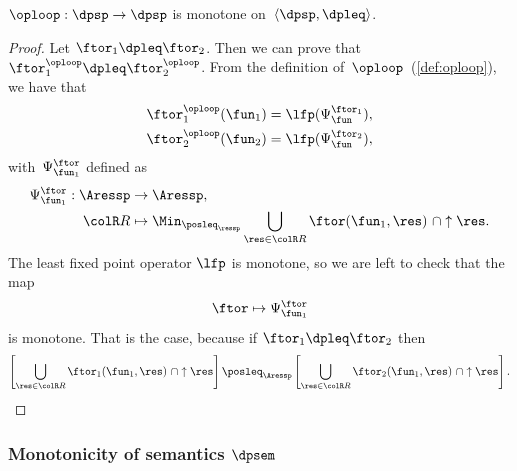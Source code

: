 \begin{lemma}
\label{lem:loop-monotone}$\oploop:\dpsp\rightarrow\dpsp$ is monotone
on~$\langle\dpsp,\dpleq\rangle$.
\end{lemma}
\begin{proof}
Let $\ftor_{1}\dpleq\ftor_{2}$. Then we can prove that $\ftor_{1}^{\oploop}\dpleq\ftor_{2}^{\oploop}$.
From the definition of~$\oploop$~(\cref{def:oploop}), we
have that
\begin{align*}
\ftor_{1}^{\oploop}(\fun_{1}) & =\lfp(\Psi_{\fun}^{\ftor_{1}}),\\
\ftor_{2}^{\oploop}(\fun_{2}) & =\lfp(\Psi_{\fun}^{\ftor_{2}}),
\end{align*}
with~$\Psi_{\fun_{1}}^{\ftor}$ defined as
\begin{align*}
\Psi_{\fun_{1}}^{\ftor}:\Aressp & \rightarrow\Aressp,\\
{\colR R} & \mapsto\Min_{\posleq_{\ressp}}\bigcup_{\res\in{\colR R}}\ftor(\fun_{1},\res)\ \cap\uparrow\res.
\end{align*}
The least fixed point operator $\lfp$ is monotone, so we are left
to check that the map
\[
\ftor\mapsto\Psi_{\fun_{1}}^{\ftor}
\]
is monotone. That is the case, because if $\ftor_{1}\dpleq\ftor_{2}$
then
\[
\left[\bigcup_{\res\in{\colR R}}\ftor_{1}(\fun_{1},\res)\ \cap\uparrow\res\right]\posleq_{\Aressp}\left[\bigcup_{\res\in{\colR R}}\ftor_{2}(\fun_{1},\res)\ \cap\uparrow\res\right].
\]
\end{proof}


\subsubsection{Monotonicity of semantics $\dpsem$}



